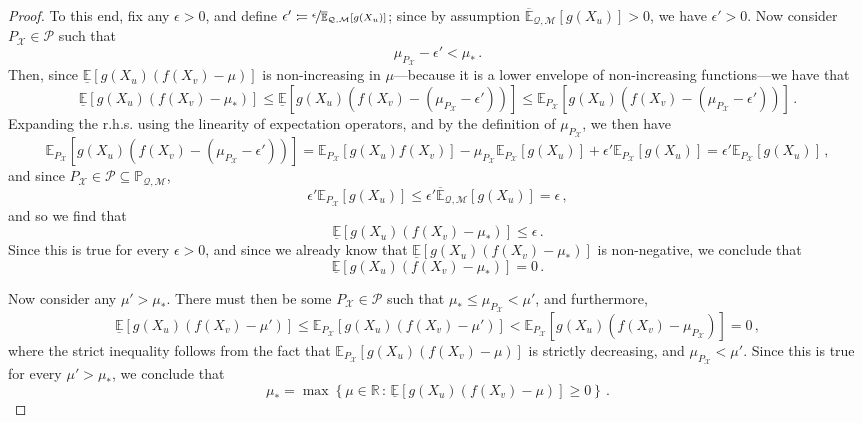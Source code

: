 \documentclass[twoside,11pt]{article}
\newcommand{\reals}{\mathbb{R}}
\newcommand{\states}{\mathcal{X}}
\newcommand{\uexp}{\overline{\mathbb{E}}_{\rateset,\mathcal{M}}}
\newcommand{\rateset}{\mathcal{Q}}
\newcommand{\coloneqq}{:\!=}
\begin{document}
\begin{proof}
To this end, fix any $\epsilon>0$, and define $\epsilon'\coloneqq \nicefrac{\epsilon}{\uexp[g(X_u)]}$; since by assumption $\uexp[g(X_u)]>0$, we have $\epsilon' >0$. Now consider ${P_\states}\in\mathcal{P}$ such that
\begin{equation*}
\mu_{P_\states} - \epsilon' < \mu_*\,.
\end{equation*}
Then, since $\underline{\mathbb{E}}[g(X_u)(f(X_v) - \mu)]$ is non-increasing in $\mu$---because it is a lower envelope of non-increasing functions---we have that
\begin{equation*}
\underline{\mathbb{E}}[g(X_u)(f(X_v) - \mu_*)] \leq \underline{\mathbb{E}}[g(X_u)(f(X_v) - (\mu_{P_\states} - \epsilon'))]\leq \mathbb{E}_{P_\states}[g(X_u)(f(X_v) - (\mu_{P_\states} - \epsilon'))]\,.
\end{equation*}
Expanding the r.h.s. using the linearity of expectation operators, and by the definition of $\mu_{P_\states}$, we then have
\begin{equation*}
\mathbb{E}_{P_\states}[g(X_u)(f(X_v) - (\mu_{P_\states} - \epsilon'))] = \mathbb{E}_{P_\states}[g(X_u)f(X_v)] - \mu_{P_\states}\mathbb{E}_{P_\states}[g(X_u)] + \epsilon'\mathbb{E}_{P_\states}[g(X_u)] = \epsilon'\mathbb{E}_{P_\states}[g(X_u)]\,,
\end{equation*}
and since ${P_\states}\in\mathcal{P}\subseteq\mathbb{P}_{\rateset,\mathcal{M}}$,
\begin{equation*}
\epsilon'\mathbb{E}_{P_\states}[g(X_u)] \leq \epsilon'\uexp[g(X_u)]=\epsilon\,,
\end{equation*}
and so we find that
\begin{equation*}
\underline{\mathbb{E}}[g(X_u)(f(X_v) - \mu_*)] \leq \epsilon\,.
\end{equation*}
Since this is true for every $\epsilon>0$, and since we already know that $\underline{\mathbb{E}}[g(X_u)(f(X_v) - \mu_*)]$ is non-negative, we conclude that
\begin{equation*}
\underline{\mathbb{E}}[g(X_u)(f(X_v) - \mu_*)] = 0\,.
\end{equation*}

Now consider any $\mu' > \mu_*$. There must then be some ${P_\states}\in\mathcal{P}$ such that $\mu_*\leq \mu_{P_\states} < \mu'$, and furthermore,
\begin{equation*}
\underline{\mathbb{E}}[g(X_u)(f(X_v) - \mu')] \leq \mathbb{E}_{P_\states}[g(X_u)(f(X_v) - \mu')] < \mathbb{E}_{P_\states}[g(X_u)(f(X_v) - \mu_{P_\states})] = 0\,,
\end{equation*}
where the strict inequality follows from the fact that $\mathbb{E}_{P_\states}[g(X_u)(f(X_v) - \mu)]$ is strictly decreasing, and $\mu_{P_\states}<\mu'$. Since this is true for every $\mu'>\mu_*$, we conclude that
\begin{equation*}
\mu_* = \max\left\{ \mu\in\reals\,:\, \underline{\mathbb{E}}[g(X_u)(f(X_v) - \mu)] \geq 0 \right\}\,.
\end{equation*}


\end{proof}
\end{document}
